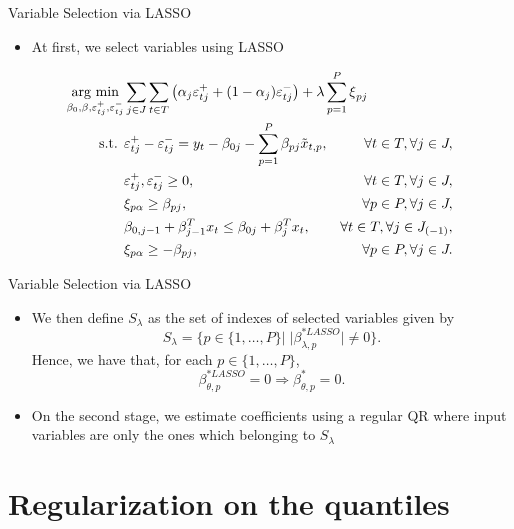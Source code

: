 \begin{frame}{Variable Selection via LASSO}

\begin{itemize}
\tightlist
\item
  At first, we select variables using LASSO
\end{itemize}

\begin{eqnarray*}
\underset{\beta_{0},\beta,\varepsilon_{t j}^{+},\varepsilon_{t j}^{-}}{\text{arg min}} & \sum_{j \in J} \sum_{t \in T}\left(\alpha_j \varepsilon_{t j}^{+}+(1-\alpha_j)\varepsilon_{t j}^{-}\right)+\lambda\sum_{p=1}^{P}\mbox{\ensuremath{\xi}}_{p j} \span \label{eq:obj-lasso} \\
\mbox{s.t. } & \varepsilon_{t j}^{+}-\varepsilon_{t j}^{-}= y_{t}-\beta_{0 j}-\sum_{p=1}^{P}\beta_{p j}\tilde x_{t,p},&\forall t\in T, \forall j \in J, \\
& \varepsilon_{t j}^{+},\varepsilon_{t j}^{-}\geq0,&\forall t \in T, \forall j \in J,\\
& \xi_{p\alpha}\geq\beta_{p j},&\forall p\in P, \forall j \in J,  \label{l1-qar-3}
\\
& \beta_{0,j-1} + \beta_{j-1}^T x_{t} \leq \beta_{0j} + \beta_{j}^T x_{t}, & \forall t \in T, \forall j \in J_{(-1)},\\
& \xi_{p\alpha}\geq-\beta_{p j},&\forall p\in P, \forall j \in J. 
\end{eqnarray*}

\end{frame}

\begin{frame}{Variable Selection via LASSO}

\begin{itemize}
\item
  We then define \(S_\lambda\) as the set of indexes of selected
  variables given by \[
  S_{\lambda} = \{ p \in \{ 1,\dots,P \} | \; |\beta^{*LASSO}_{\lambda,p}| \neq 0  \}.
  \] Hence, we have that, for each \(p \in \{ 1,\dots,P \}\),
  \[\beta^{*LASSO}_{\theta,p} = 0 \Longrightarrow \beta^{*}_{\theta,p} = 0.\]
\item
  On the second stage, we estimate coefficients using a regular QR where
  input variables are only the ones which belonging to \(S_\lambda\)
\end{itemize}

\end{frame}

\section{Regularization on the
quantiles}\label{regularization-on-the-quantiles}

